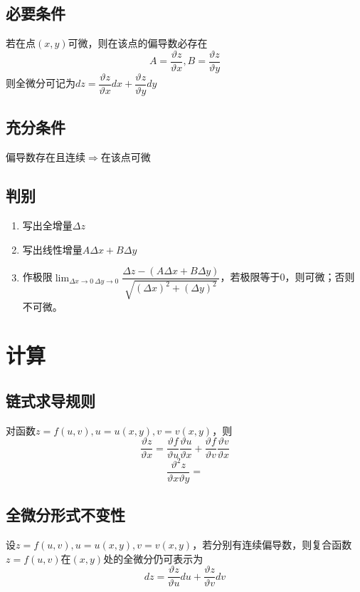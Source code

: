\subsection{必要条件}
若在点\((x, y)\)可微，则在该点的偏导数必存在\[A = \dfrac{\vartheta z}{\vartheta x}, B = \dfrac{\vartheta z}{\vartheta y}\]
则全微分可记为\(dz = \dfrac{\vartheta z}{\vartheta x}dx + \dfrac{\vartheta z}{\vartheta y}dy\)


\subsection{充分条件}
偏导数存在且连续\(\Rightarrow\)在该点可微


\subsection{判别}
\begin{enumerate}
    \item 写出全增量\(\Delta z\)
    \item 写出线性增量\(A\Delta x + B\Delta y\)
    \item 作极限\(\displaystyle\lim_{\Delta x \to 0\ \Delta y \to 0}\dfrac{\Delta z - (A\Delta x + B\Delta y)}{\sqrt{(\Delta x)^2 + (\Delta y)^2}}\)，若极限等于0，则可微；否则不可微。
\end{enumerate}



\section{计算}

\subsection{链式求导规则}
对函数\(z = f(u, v), u = u(x, y), v = v(x, y)\)，则\[\dfrac{\vartheta z}{\vartheta x} = \dfrac{\vartheta f}{\vartheta u}\dfrac{\vartheta u}{\vartheta x} + \dfrac{\vartheta f}{\vartheta v}\dfrac{\vartheta v}{\vartheta x}\]
\[\dfrac{\vartheta^2z}{\vartheta x\vartheta y} = \]


\subsection{全微分形式不变性}
设\(z = f(u, v), u = u(x, y), v = v(x, y)\)，若分别有连续偏导数，则复合函数\(z = f(u, v)\)在\((x, y)\)处的全微分仍可表示为\[dz = \dfrac{\vartheta z}{\vartheta u}du + \dfrac{\vartheta z}{\vartheta v}dv\]

